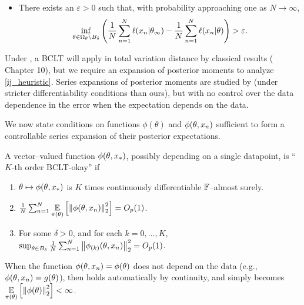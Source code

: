 \begin{assu}
\begin{enumerate}
\begin{itemize}
    \item There exists an $\varepsilon > 0$ such that, with probability
    approaching one as $N \rightarrow \infty$,
    \begin{align*}
    \inf_{\theta \in \Omega_\theta \setminus B_{\delta}}
    \left( \frac{1}{N}\sum_{n=1}^N \ell(x_n \vert \theta_{\infty}) -
           \frac{1}{N}\sum_{n=1}^N \ell(x_n \vert \theta)
    \right) > \varepsilon.
    \end{align*}
    \end{itemize}
%
\end{enumerate}

\end{assu}


Under , a BCLT will apply in total variation distance by
classical results (\citet{van:2000:asymptotic} Chapter 10), but we require an
expansion of posterior moments to analyze \eqref{ij_heuristic}.  Series
expansions of posterior moments are studied by
\citet{kass:1990:posteriorexpansions} (under stricter differentiability
conditions than ours), but with no control over the data dependence in the error
when the expectation depends on the data.

We now state conditions on functions $\phi(\theta)$ and $\phi(\theta, x_n)$
sufficient to form a controllable series expansion of their posterior
expectations.

\begin{defn}
%
A vector--valued function $\phi(\theta, x_{*})$, possibly depending on a single
datapoint, is ``$K$-th order BCLT-okay'' if
%
\begin{enumerate}
%
\item{}
    $\theta \mapsto \phi(\theta, x_{*})$
    is $K$ times continuously differentiable $\mathbb{F}$--almost surely.
%
\item{}
    $\frac{1}{N}\sum_{n=1}^N \underset{\pi(\theta)}{\mathbb{E}}\left[\left\Vert \phi(\theta, x_n)\right\Vert^2_2\right] = O_p(1)$.
%
\item{}
For some $\delta > 0$, and for each $k = 0, \ldots, K$,
$\sup_{\theta \in B_{\delta}}
    \frac{1}{N}\sum_{n=1}^N \left\Vert \phi_{(k)}(\theta, x_n)\right\Vert^2_2 = O_p(1)$.
%
\end{enumerate}
%
When the function $\phi(\theta, x_n) = \phi(\theta)$ does not depend on the
data (e.g., $\phi(\theta, x_n) = g(\theta)$), then 
holds automatically by continuity, and  simply becomes
$\underset{\pi(\theta)}{\mathbb{E}}\left[\left\Vert \phi(\theta)\right\Vert^2_2\right] < \infty$.
%
\end{defn}


